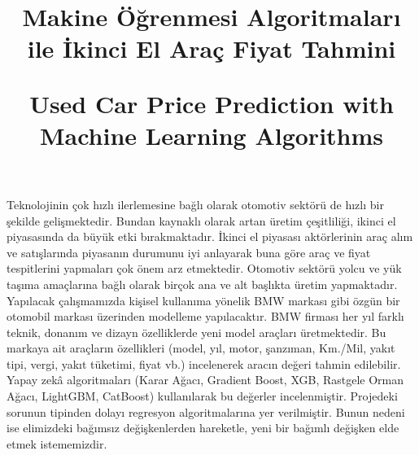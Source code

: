 \documentclass[conference]{IEEEtran}
\begin{document}
\IEEEpubid{\makebox[\columnwidth]{\hfill} \hspace{\columnsep}\makebox[\columnwidth]{}}

\title{Makine Öğrenmesi Algoritmaları ile İkinci El Araç Fiyat Tahmini
\\
\*

Used Car Price Prediction with Machine Learning Algorithms
}
\author{
	
\and
{}
}
\maketitle
\thispagestyle{plain}
\pagestyle{plain}
\begin{ozet}
Teknolojinin çok hızlı ilerlemesine bağlı olarak otomotiv sektörü de hızlı bir şekilde gelişmektedir. Bundan kaynaklı olarak artan üretim çeşitliliği, ikinci el piyasasında da büyük etki bırakmaktadır. İkinci el piyasası aktörlerinin araç alım ve satışlarında piyasanın durumunu iyi anlayarak buna göre araç ve fiyat tespitlerini yapmaları çok önem arz etmektedir. Otomotiv sektörü yolcu ve yük taşıma amaçlarına bağlı olarak birçok ana ve alt başlıkta üretim yapmaktadır. Yapılacak çalışmamızda kişisel kullanıma yönelik BMW markası gibi özgün bir otomobil markası üzerinden modelleme yapılacaktır. BMW firması her yıl farklı teknik, donanım ve dizayn özelliklerde yeni model araçları üretmektedir. Bu markaya ait araçların özellikleri (model, yıl, motor, şanzıman, Km./Mil, yakıt tipi, vergi, yakıt tüketimi, fiyat vb.) incelenerek aracın değeri tahmin edilebilir. Yapay zekâ algoritmaları (Karar Ağacı, Gradient Boost, XGB, Rastgele Orman Ağacı, LightGBM, CatBoost) kullanılarak bu değerler incelenmiştir. Projedeki sorunun tipinden dolayı regresyon algoritmalarına yer verilmiştir. Bunun nedeni ise elimizdeki bağımsız değişkenlerden hareketle, yeni bir bağımlı değişken elde etmek istememizdir.
\end{ozet}
\end{document}
